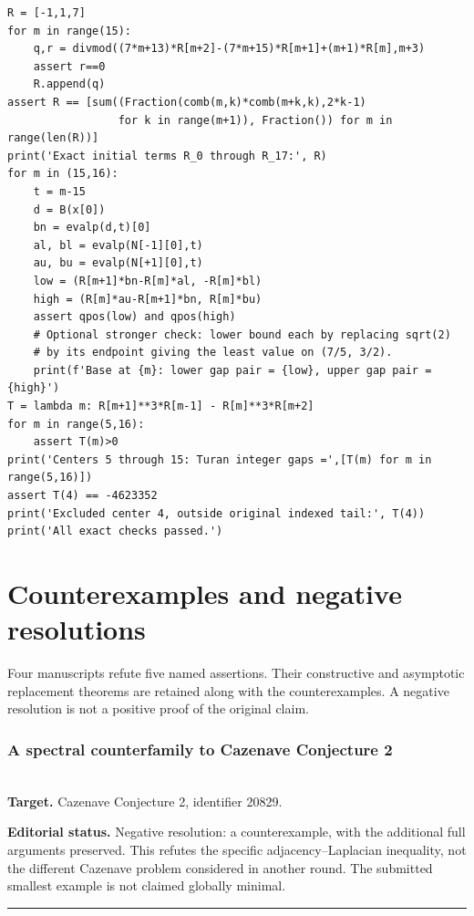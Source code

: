 \documentclass[11pt,a4paper]{article}
\begin{document}
{\begin{Verbatim}[fontsize=\footnotesize,breaklines,breakanywhere]
R = [-1,1,7]
for m in range(15):
    q,r = divmod((7*m+13)*R[m+2]-(7*m+15)*R[m+1]+(m+1)*R[m],m+3)
    assert r==0
    R.append(q)
assert R == [sum((Fraction(comb(m,k)*comb(m+k,k),2*k-1)
                 for k in range(m+1)), Fraction()) for m in range(len(R))]
print('Exact initial terms R_0 through R_17:', R)
for m in (15,16):
    t = m-15
    d = B(x[0])
    bn = evalp(d,t)[0]
    al, bl = evalp(N[-1][0],t)
    au, bu = evalp(N[+1][0],t)
    low = (R[m+1]*bn-R[m]*al, -R[m]*bl)
    high = (R[m]*au-R[m+1]*bn, R[m]*bu)
    assert qpos(low) and qpos(high)
    # Optional stronger check: lower bound each by replacing sqrt(2)
    # by its endpoint giving the least value on (7/5, 3/2).
    print(f'Base at {m}: lower gap pair = {low}, upper gap pair = {high}')
T = lambda m: R[m+1]**3*R[m-1] - R[m]**3*R[m+2]
for m in range(5,16):
    assert T(m)>0
print('Centers 5 through 15: Turan integer gaps =',[T(m) for m in range(5,16)])
assert T(4) == -4623352
print('Excluded center 4, outside original indexed tail:', T(4))
print('All exact checks passed.')
\end{Verbatim}
}
\endgroup


\clearpage

\part{Counterexamples and negative resolutions}

\noindent Four manuscripts refute five named assertions. Their constructive and asymptotic replacement theorems are retained along with the counterexamples. A negative resolution is not a positive proof of the original claim.


\section{A spectral counterfamily to Cazenave Conjecture 2}
\label{section:R11H}
\\[3pt]
\noindent\textbf{Target.} Cazenave Conjecture 2, identifier 20829.

\noindent\textbf{Editorial status.} Negative resolution: a counterexample, with the additional full arguments preserved. This refutes the specific adjacency--Laplacian inequality, not the different Cazenave problem considered in another round. The submitted smallest example is not claimed globally minimal.

\smallskip\hrule\medskip
\end{document}
